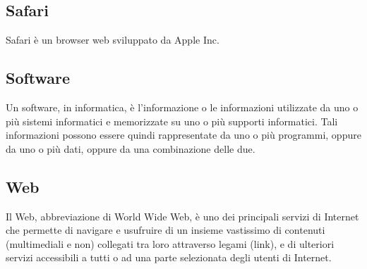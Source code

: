 \documentclass[a4paper, titlepage]{article}
\begin{document}
	 \subsection{Safari}
 	 Safari è un browser web sviluppato da Apple Inc.
 	 
 	 \subsection{Software}
 	 Un software, in informatica, è l’informazione o le informazioni utilizzate da uno o più sistemi informatici
 	 e memorizzate su uno o più supporti informatici. Tali informazioni possono essere quindi rappresentate da uno o più programmi, oppure da uno o più dati, oppure da una combinazione
 	 delle due.
 	 
 	 \subsection{Web}
 	 Il Web, abbreviazione di World Wide Web, è uno dei principali servizi di Internet che permette di
 	 navigare e usufruire di un insieme vastissimo di contenuti (multimediali e non) collegati tra loro
 	 attraverso legami (link), e di ulteriori servizi accessibili a tutti o ad una parte selezionata degli
 	 utenti di Internet.
 	 
	
\end{document}

